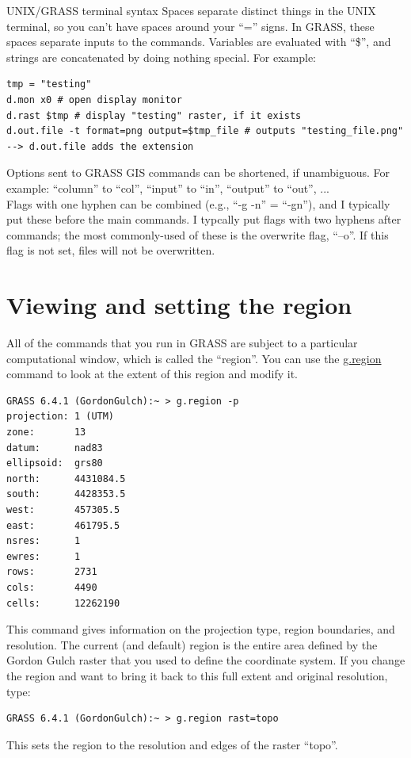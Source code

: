 \documentclass{book}
\begin{document}
\begin{boxx}[!ht]
\begin{bclogo}[arrondi = 0.1, logo = \bcrosevents]{UNIX/GRASS terminal syntax}
Spaces separate distinct things in the UNIX terminal, so you can't have spaces around your ``='' signs. In GRASS, these spaces separate inputs to the commands. Variables are evaluated with ``\$'', and strings are concatenated by doing nothing special. For example:
\begin{lstlisting}
tmp = "testing"
d.mon x0 # open display monitor
d.rast $tmp # display "testing" raster, if it exists
d.out.file -t format=png output=$tmp_file # outputs "testing_file.png" --> d.out.file adds the extension
\end{lstlisting}
\end{bclogo}

Options sent to GRASS GIS commands can be shortened, if unambiguous. For example: ``column'' to ``col'', ``input'' to ``in'', ``output'' to ``out'', ... \\

Flags with one hyphen can be combined (e.g., ``-g -n'' = ``-gn''), and I typically put these before the main commands. I typcally put flags with two hyphens after commands; the most commonly-used of these is the overwrite flag, ``--o''. If this flag is not set, files will not be overwritten.
\caption{UNIX/GRASS terminal syntax}
\end{boxx}


\section{Viewing and setting the region}

All of the commands that you run in GRASS are subject to a particular computational window, which is called the ``region''. You can use the \url{g.region} command to look at the extent of this region and modify it.
\begin{lstlisting}
GRASS 6.4.1 (GordonGulch):~ > g.region -p
projection: 1 (UTM)
zone:       13
datum:      nad83
ellipsoid:  grs80
north:      4431084.5
south:      4428353.5
west:       457305.5
east:       461795.5
nsres:      1
ewres:      1
rows:       2731
cols:       4490
cells:      12262190
\end{lstlisting}
This command gives information on the projection type, region boundaries, and resolution. The current (and default) region is the entire area defined by the Gordon Gulch raster that you used to define the coordinate system. If you change the region and want to bring it back to this full extent and original resolution, type:
\begin{lstlisting}
GRASS 6.4.1 (GordonGulch):~ > g.region rast=topo
\end{lstlisting}
This sets the region to the resolution and edges of the raster ``topo''.
\end{document}
